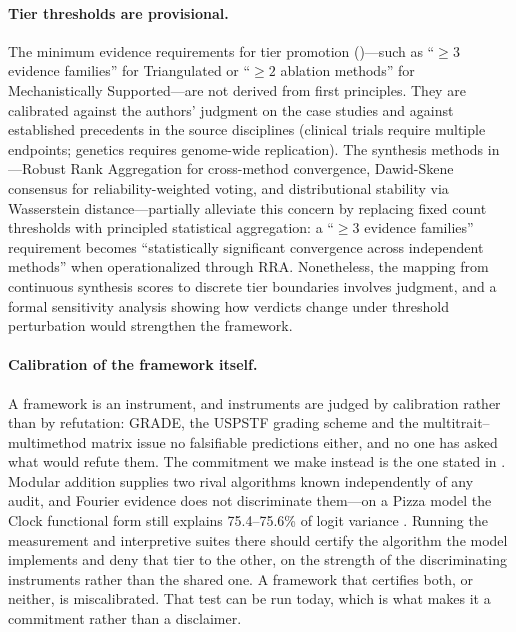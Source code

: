 \documentclass{article}
\begin{document}
\paragraph{Tier thresholds are provisional.} The minimum evidence requirements for tier promotion ()---such as ``$\geq 3$ evidence families'' for Triangulated or ``$\geq 2$ ablation methods'' for Mechanistically Supported---are not derived from first principles. They are calibrated against the authors' judgment on the case studies and against established precedents in the source disciplines (clinical trials require multiple endpoints; genetics requires genome-wide replication). The synthesis methods in ---Robust Rank Aggregation for cross-method convergence, Dawid-Skene consensus for reliability-weighted voting, and distributional stability via Wasserstein distance---partially alleviate this concern by replacing fixed count thresholds with principled statistical aggregation: a ``$\geq 3$ evidence families'' requirement becomes ``statistically significant convergence across independent methods'' when operationalized through RRA. Nonetheless, the mapping from continuous synthesis scores to discrete tier boundaries involves judgment, and a formal sensitivity analysis showing how verdicts change under threshold perturbation would strengthen the framework.

\paragraph{Calibration of the framework itself.} A framework is an instrument, and instruments are judged by calibration rather than by refutation: GRADE, the USPSTF grading scheme and the multitrait--multimethod matrix issue no falsifiable predictions either, and no one has asked what would refute them. The commitment we make instead is the one stated in . Modular addition supplies two rival algorithms known independently of any audit, and Fourier evidence does not discriminate them---on a Pizza model the Clock functional form still explains 75.4--75.6\% of logit variance \citep[Table~2]{zhong2023clock}. Running the measurement and interpretive suites there should certify the algorithm the model implements and deny that tier to the other, on the strength of the discriminating instruments rather than the shared one. A framework that certifies both, or neither, is miscalibrated. That test can be run today, which is what makes it a commitment rather than a disclaimer.
\end{document}
